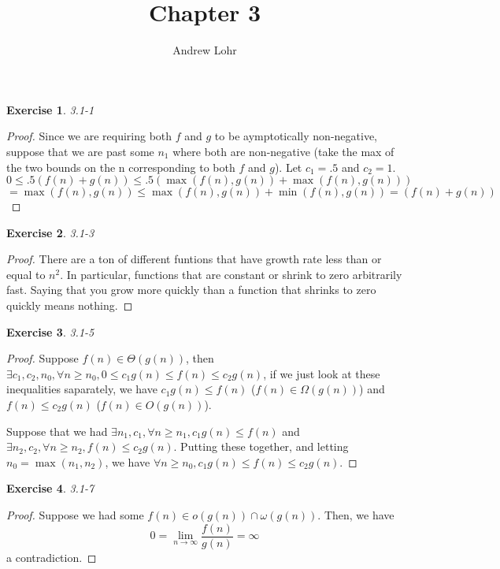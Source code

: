 \documentclass{article}
\title{Chapter 3}
\author{Andrew Lohr}
\newtheorem{th1}{Exercise}
\begin{document}
\maketitle

\begin{th1}\label{ex1}
3.1-1
\end{th1}
\begin{proof}
Since we are requiring both $f$ and $g$ to be aymptotically non-negative, suppose that we are past some $n_1$ where both are non-negative (take the max of the two bounds on the n corresponding to both $f$ and $g$). Let $c_1=.5$ and $c_2=1$.
\[
0\le .5(f(n)+g(n)) \le .5(\max(f(n),g(n)) + \max(f(n),g(n))) \]\[= \max(f(n),g(n)) \le \max(f(n),g(n))+\min(f(n),g(n)) = (f(n)+g(n))
\]
\end{proof}

\begin{th1}\label{ex2}
3.1-3
\end{th1}
\begin{proof}
There are a ton of different funtions that have growth rate less than or equal to $n^2$. In particular, functions that are constant or shrink to zero arbitrarily fast. Saying that you grow more quickly than a function that shrinks to zero quickly means nothing. 
\end{proof}

\begin{th1}\label{ex3}
3.1-5
\end{th1}
\begin{proof}
Suppose $f(n)\in \Theta(g(n))$, then $\exists c_1,c_2,n_0, \forall n\ge n_0, 0\le c_1 g(n) \le f(n) \le c_2 g(n)$, if we just look at these inequalities saparately, we have $c_1 g(n) \le f(n)$ ($f(n) \in \Omega(g(n))$) and $f(n) \le c_2 g(n)$ ($f(n)\in O(g(n))$).

Suppose that we had $\exists n_1, c_1, \forall n\ge n_1, c_1 g(n) \le f(n)$ and $\exists n_2,c_2, \forall n\ge n_2, f(n)\le c_2g(n)$. Putting these together, and letting $n_0 = \max(n_1,n_2)$, we have $\forall n\ge n_0, c_1 g(n) \le f(n) \le c_2 g(n)$. 
\end{proof}

\begin{th1}\label{ex4}
3.1-7
\end{th1}
\begin{proof}
Suppose we had some $f(n) \in o(g(n)) \cap \omega(g(n))$. Then, we have
\[
0 = \lim_{n\rightarrow \infty} \frac{f(n)}{g(n)} = \infty
\]
a contradiction.

\end{proof}
\end{document}
